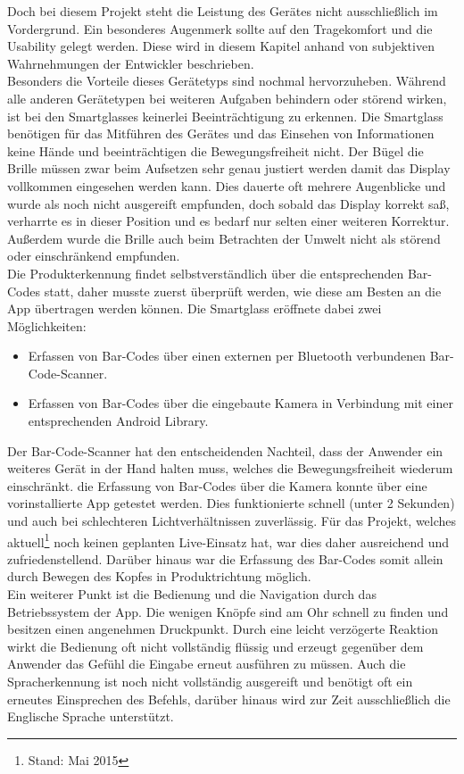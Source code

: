 Doch bei diesem Projekt steht die Leistung des Gerätes nicht ausschließlich im Vordergrund. Ein besonderes Augenmerk sollte auf den Tragekomfort und die Usability gelegt werden. Diese wird in diesem Kapitel anhand von subjektiven Wahrnehmungen der Entwickler beschrieben.\\

Besonders die Vorteile dieses Gerätetyps sind nochmal hervorzuheben. Während alle anderen Gerätetypen bei weiteren Aufgaben behindern oder störend wirken, ist bei den Smartglasses keinerlei Beeinträchtigung zu erkennen. Die Smartglass benötigen für das Mitführen des Gerätes und das Einsehen von Informationen keine Hände und beeinträchtigen die Bewegungsfreiheit nicht. Der Bügel \bzw die Brille müssen zwar beim Aufsetzen sehr genau justiert werden damit das Display vollkommen eingesehen werden kann. Dies dauerte oft mehrere Augenblicke und wurde als noch nicht ausgereift empfunden, doch sobald das Display korrekt saß, verharrte es in dieser Position und es bedarf nur selten einer weiteren Korrektur. Außerdem wurde die Brille auch beim Betrachten der Umwelt nicht als störend oder einschränkend empfunden.\\

Die Produkterkennung findet selbstverständlich über die entsprechenden Bar-Codes statt, daher musste zuerst überprüft werden, wie diese am Besten an die App übertragen werden können. Die Smartglass eröffnete dabei zwei Möglichkeiten:
\begin{itemize}
	\item Erfassen von Bar-Codes über einen externen per Bluetooth verbundenen Bar-Code-Scanner.
	\item Erfassen von Bar-Codes über die eingebaute Kamera in Verbindung mit einer entsprechenden Android Library.
\end{itemize}
Der Bar-Code-Scanner hat den entscheidenden Nachteil, dass der Anwender ein weiteres Gerät in der Hand halten muss, welches die Bewegungsfreiheit wiederum einschränkt. die Erfassung von Bar-Codes über die Kamera konnte über eine vorinstallierte App getestet werden. Dies funktionierte schnell (unter 2 Sekunden) und auch bei schlechteren Lichtverhältnissen zuverlässig. Für das Projekt, welches aktuell\footnote{Stand: Mai 2015} noch keinen geplanten Live-Einsatz hat, war dies daher ausreichend und zufriedenstellend. Darüber hinaus war die Erfassung des Bar-Codes somit allein durch Bewegen des Kopfes in Produktrichtung möglich.\\

Ein weiterer Punkt ist die Bedienung und die Navigation durch das Betriebssystem \bzw der App. Die wenigen Knöpfe sind am Ohr schnell zu finden und besitzen einen angenehmen Druckpunkt. Durch eine leicht verzögerte Reaktion wirkt die Bedienung oft nicht vollständig flüssig und erzeugt gegenüber dem Anwender das Gefühl die Eingabe erneut ausführen zu müssen. Auch die Spracherkennung ist noch nicht vollständig ausgereift und benötigt oft ein erneutes Einsprechen des Befehls, darüber hinaus wird zur Zeit ausschließlich die Englische Sprache unterstützt.\\

